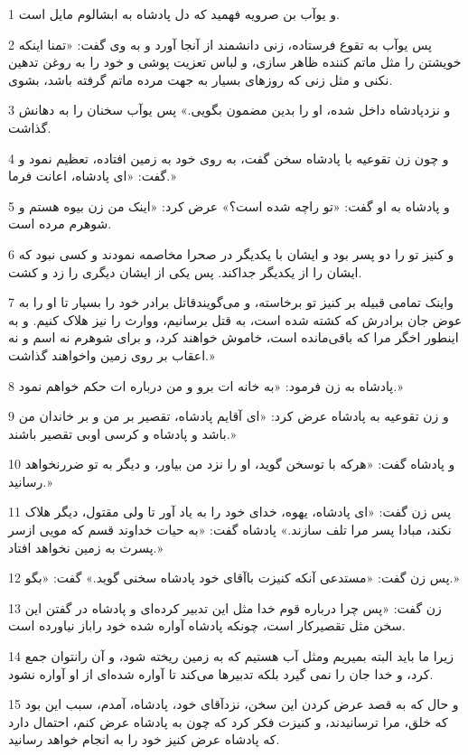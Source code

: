 \par 1 و یوآب بن صرویه فهمید که دل پادشاه به ابشالوم مایل است.
\par 2 پس یوآب به تقوع فرستاده، زنی دانشمند از آنجا آورد و به وی گفت: «تمنا اینکه خویشتن را مثل ماتم کننده ظاهر سازی، و لباس تعزیت پوشی و خود را به روغن تدهین نکنی و مثل زنی که روزهای بسیار به جهت مرده ماتم گرفته باشد، بشوی.
\par 3 و نزدپادشاه داخل شده، او را بدین مضمون بگویی.» پس یوآب سخنان را به دهانش گذاشت.
\par 4 و چون زن تقوعیه با پادشاه سخن گفت، به روی خود به زمین افتاده، تعظیم نمود و گفت: «ای پادشاه، اعانت فرما.»
\par 5 و پادشاه به او گفت: «تو راچه شده است؟» عرض کرد: «اینک من زن بیوه هستم و شوهرم مرده است.
\par 6 و کنیز تو را دو پسر بود و ایشان با یکدیگر در صحرا مخاصمه نمودند و کسی نبود که ایشان را از یکدیگر جداکند. پس یکی از ایشان دیگری را زد و کشت.
\par 7 واینک تمامی قبیله بر کنیز تو برخاسته، و می‌گویندقاتل برادر خود را بسپار تا او را به عوض جان برادرش که کشته شده است، به قتل برسانیم، ووارث را نیز هلاک کنیم. و به اینطور اخگر مرا که باقی‌مانده است، خاموش خواهند کرد، و برای شوهرم نه اسم و نه اعقاب بر روی زمین واخواهند گذاشت.»
\par 8 پادشاه به زن فرمود: «به خانه ات برو و من درباره ات حکم خواهم نمود.»
\par 9 و زن تقوعیه به پادشاه عرض کرد: «ای آقایم پادشاه، تقصیر بر من و بر خاندان من باشد و پادشاه و کرسی اوبی تقصیر باشند.»
\par 10 و پادشاه گفت: «هر‌که با توسخن گوید، او را نزد من بیاور، و دیگر به تو ضررنخواهد رسانید.»
\par 11 پس زن گفت: «ای پادشاه، یهوه، خدای خود را به یاد آور تا ولی مقتول، دیگر هلاک نکند، مبادا پسر مرا تلف سازند.» پادشاه گفت: «به حیات خداوند قسم که مویی ازسر پسرت به زمین نخواهد افتاد.»
\par 12 پس زن گفت: «مستدعی آنکه کنیزت باآقای خود پادشاه سخنی گوید.» گفت: «بگو.»
\par 13 زن گفت: «پس چرا درباره قوم خدا مثل این تدبیر کرده‌ای و پادشاه در گفتن این سخن مثل تقصیرکار است، چونکه پادشاه آواره شده خود راباز نیاورده است.
\par 14 زیرا ما باید البته بمیریم ومثل آب هستیم که به زمین ریخته شود، و آن رانتوان جمع کرد، و خدا جان را نمی گیرد بلکه تدبیرها می‌کند تا آواره شده‌ای از او آواره نشود.
\par 15 و حال که به قصد عرض کردن این سخن، نزدآقای خود، پادشاه، آمدم، سبب این بود که خلق، مرا ترسانیدند، و کنیزت فکر کرد که چون به پادشاه عرض کنم، احتمال دارد که پادشاه عرض کنیز خود را به انجام خواهد رسانید.
